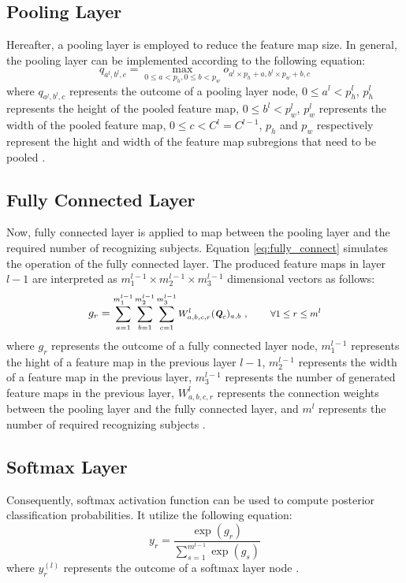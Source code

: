 \documentclass[conference]{IEEEtran}
\begin{document}
\subsection{Pooling Layer}
Hereafter, a pooling layer is employed to reduce the feature map size. In general, the pooling layer can be implemented according to the following equation:
\begin{equation}
q_{a^{l},b^{l},c}=\underset{0\leq a<p_h,0\leq b<p_w}{\max} o_{a^{l}\times p_h+a, b^{l}\times p_w+b,c}
\label{eq:pooling_layer}
\end{equation}
where $q_{a^{l},b^{l},c}$ represents the outcome of a pooling layer node, $0\leq a^{l} <p_h^{l}$, $p_h^{l}$ represents the height of the pooled feature map, $0\leq b^{l} <p_w^{l}$, $p_w^{l}$ represents the width of the pooled feature map, $0\leq c <C^{l}=C^{l-1}$, $p_h$ and $p_w$ respectively represent the hight and width of the feature map subregions that need to be pooled \cite{wu2017introduction}. 

\subsection{Fully Connected Layer}
Now, fully connected layer is applied to map between the pooling layer and the required number of recognizing subjects. Equation \ref{eq:fully_connect} simulates the operation of the fully connected layer. The produced feature maps in layer $l-1$ are interpreted as $m_1^{l-1} \times m_2^{l-1} \times m_3^{l-1}$ dimensional vectors as follows:
\begin{equation}
g_{r}=\text{\footnotesize $\sum_{a=1}^{m_1^{l-1}} \sum_{b=1}^{m_2^{l-1}} \sum_{c=1}^{m_3^{l-1}} W_{a,b,c,r}^{l}(\textit{\textbf{Q}}_{c})_{a,b}~, ~~~~~~~\forall 1 \leq r \leq m^{l}$}
\label{eq:fully_connect}
\end{equation}
where $g_{r}$ represents the outcome of a fully connected layer node, $m_1^{l-1}$ represents the hight of a feature map in the previous layer $l-1$, $m_2^{l-1}$ represents the width of a feature map in the previous layer, $m_3^{l-1}$ represents the number of generated feature maps in the previous layer, $W_{a,b,c,r}^{l}$ represents the connection weights between the pooling layer and the fully connected layer, and $m^{l}$ represents the number of required recognizing subjects \cite{stutz2014neural}.\\

\subsection{Softmax Layer}
Consequently, softmax activation function can be used to compute posterior classification probabilities. It utilize the following equation:
\begin{equation}
y_{r}=\frac{\exp(g_{r})}{\sum_{s=1}^{m^{l-1}}\exp(g_{s})} 
\label{eq:softmax}
\end{equation}
where $y_{r}^{(l)}$ represents the outcome of a softmax layer node \cite{stutz2014neural}.
\end{document}
